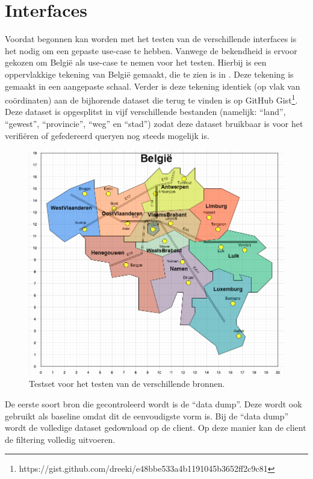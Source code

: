 \documentclass[twocolumn]{phdsymp} %
\begin{document}
\section{Interfaces}
Voordat begonnen kan worden met het testen van de verschillende interfaces is het nodig om een gepaste use-case te hebben. Vanwege de bekendheid is ervoor gekozen om België als use-case te nemen voor het testen. Hierbij is een oppervlakkige tekening van België gemaakt, die te zien is in . Deze tekening is gemaakt in een aangepaste schaal. Verder is deze tekening identiek (op vlak van coördinaten) aan de bijhorende dataset die terug te vinden is op GitHub Gist\footnote{https://gist.github.com/dreeki/e48bbe533a4b1191045b3652ff2c9c81}. Deze dataset is opgesplitst in vijf verschillende bestanden (namelijk: ``land'', ``gewest'', ``provincie'', ``weg'' en ``stad'') zodat deze dataset bruikbaar is voor het verifiëren of gefedereerd queryen nog steeds mogelijk is. 

\begin{figure}
    \centering
    \includegraphics[width=\linewidth]{images/geosparql_demo.png}
    \caption{Testset voor het testen van de verschillende bronnen.}
    \label{fig:abstr_demoset}
\end{figure}

De eerste soort bron die gecontroleerd wordt is de ``data dump''. Deze wordt ook gebruikt als baseline omdat dit de eenvoudigste vorm is. Bij de ``data dump'' wordt de volledige dataset gedownload op de client. Op deze manier kan de client de filtering volledig uitvoeren. 
\end{document}
